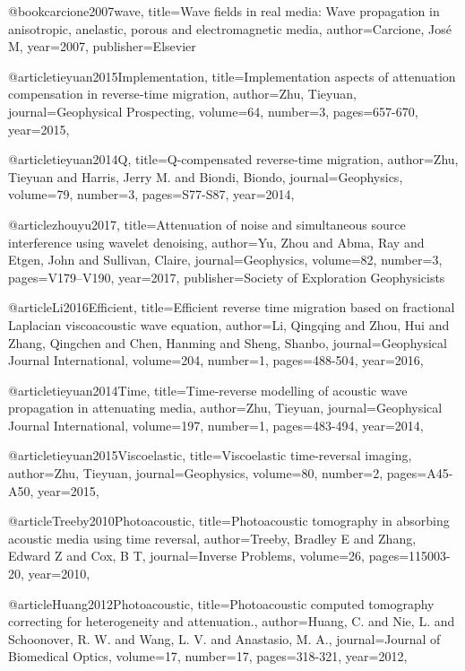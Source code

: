 @book{carcione2007wave,
  title={Wave fields in real media: Wave propagation in anisotropic, anelastic, porous and electromagnetic media},
  author={Carcione, Jos{\'e} M},
  year={2007},
  publisher={Elsevier}
}

@article{tieyuan2015Implementation,
  title={Implementation aspects of attenuation compensation in reverse‐time migration},
  author={Zhu, Tieyuan},
  journal={Geophysical Prospecting},
  volume={64},
  number={3},
  pages={657-670},
  year={2015},
}

@article{tieyuan2014Q,
  title={Q-compensated reverse-time migration},
  author={Zhu, Tieyuan and Harris, Jerry M. and Biondi, Biondo},
  journal={Geophysics},
  volume={79},
  number={3},
  pages={S77-S87},
  year={2014},
}

@article{zhouyu2017,
  title={Attenuation of noise and simultaneous source interference using wavelet denoising},
  author={Yu, Zhou and Abma, Ray and Etgen, John and Sullivan, Claire},
  journal={Geophysics},
  volume={82},
  number={3},
  pages={V179--V190},
  year={2017},
  publisher={Society of Exploration Geophysicists}
}


@article{Li2016Efficient,
  title={Efficient reverse time migration based on fractional {L}aplacian viscoacoustic wave equation},
  author={Li, Qingqing and Zhou, Hui and Zhang, Qingchen and Chen, Hanming and Sheng, Shanbo},
  journal={Geophysical Journal International},
  volume={204},
  number={1},
  pages={488-504},
  year={2016},
}

@article{tieyuan2014Time,
  title={Time-reverse modelling of acoustic wave propagation in attenuating media},
  author={Zhu, Tieyuan},
  journal={Geophysical Journal International},
  volume={197},
  number={1},
  pages={483-494},
  year={2014},
}

@article{tieyuan2015Viscoelastic,
  title={Viscoelastic time-reversal imaging},
  author={Zhu, Tieyuan},
  journal={Geophysics},
  volume={80},
  number={2},
  pages={A45-A50},
  year={2015},
}

@article{Treeby2010Photoacoustic,
  title={Photoacoustic tomography in absorbing acoustic media using time reversal},
  author={Treeby, Bradley E and Zhang, Edward Z and Cox, B T},
  journal={Inverse Problems},
  volume={26},
  pages={115003-20},
  year={2010},
}

@article{Huang2012Photoacoustic,
  title={Photoacoustic computed tomography correcting for heterogeneity and attenuation.},
  author={Huang, C. and Nie, L. and Schoonover, R. W. and Wang, L. V. and Anastasio, M. A.},
  journal={Journal of Biomedical Optics},
  volume={17},
  number={17},
  pages={318-321},
  year={2012},
}

